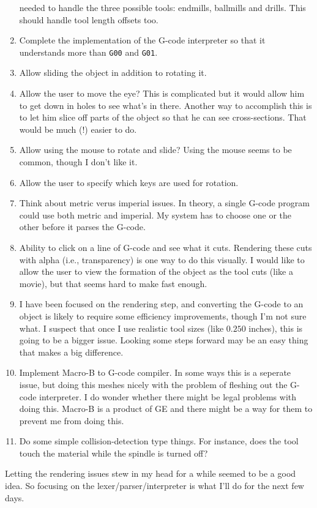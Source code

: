 \documentclass[titlepage,oneside,10pt]{article}
\begin{document}
\begin{enumerate}
  needed to handle the three possible tools: endmills, ballmills and
  drills. This should handle tool length offsets too.
\item Complete the implementation of the G-code interpreter so that it
  understands more than {\tt G00} and {\tt G01}.
\item Allow sliding the object in addition to rotating it.
\item Allow the user to move the eye? This is complicated but it would
  allow him to get down in holes to see what's in there. Another way
  to accomplish this is to let him slice off parts of the object so
  that he can see cross-sections. That would be much (!) easier to do.
\item Allow using the mouse to rotate and slide? Using the mouse seems
  to be common, though I don't like it.
\item Allow the user to specify which keys are used for rotation.
\item Think about metric verus imperial issues. In theory, a single
  G-code program could use both metric and imperial. My system has to
  choose one or the other before it parses the G-code.
\item Ability to click on a line of G-code and see what it
  cuts. Rendering these cuts with alpha (i.e., transparency) is one
  way to do this visually. I would like to allow the user to view the
  formation of the object as the tool cuts (like a movie), but that
  seems hard to make fast enough.
\item I have been focused on the rendering step, and converting the
  G-code to an object is likely to require some efficiency
  improvements, though I'm not sure what. I suspect that once I use
  realistic tool sizes (like $0.250$ inches), this is going to be a
  bigger issue. Looking some steps forward may be an easy thing that
  makes a big difference. 
\item Implement Macro-B to G-code compiler. In some ways this is a seperate
  issue, but doing this meshes nicely with the problem of fleshing out
  the G-code interpreter. I do wonder whether there might be legal
  problems with doing this. Macro-B is a product of GE and there might
  be a way for them to prevent me from doing this.
\item Do some simple collision-detection type things. For instance,
  does the tool touch the material while the spindle is turned off?
\end{enumerate}

Letting the rendering issues stew in my head for a while seemed to be a
good idea. So focusing on the lexer/parser/interpreter is what I'll do
for the next few days.
\end{document}
